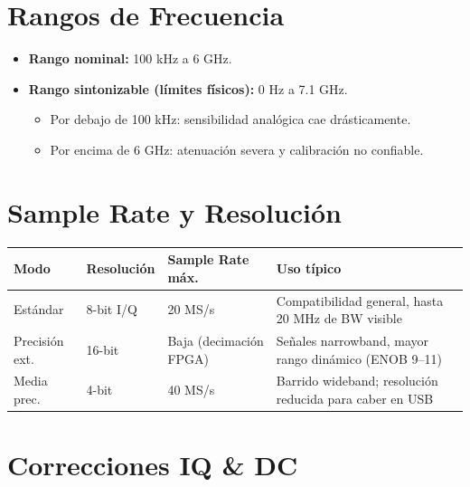 \documentclass[11pt]{article}
\begin{document}
\section{Rangos de Frecuencia}

\begin{itemize}
    \item \textbf{Rango nominal:} 100 kHz a 6 GHz.
    \item \textbf{Rango sintonizable (límites físicos):} 0 Hz a 7.1 GHz.
    \begin{itemize}
        \item Por debajo de 100 kHz: sensibilidad analógica cae drásticamente.
        \item Por encima de 6 GHz: atenuación severa y calibración no confiable.
    \end{itemize}
\end{itemize}

\section{Sample Rate y Resolución}

\begin{table}[h]
    \centering
    \begin{tabular}{llll}
        \toprule
        \textbf{Modo} & \textbf{Resolución} & \textbf{Sample Rate máx.} & \textbf{Uso típico} \\
        \midrule
        Estándar       & 8-bit I/Q  & 20 MS/s  & Compatibilidad general, hasta 20 MHz de BW visible \\
        Precisión ext. & 16-bit     & Baja (decimación FPGA) & Señales narrowband, mayor rango dinámico (ENOB 9--11) \\
        Media prec.    & 4-bit      & 40 MS/s  & Barrido wideband; resolución reducida para caber en USB \\
        \bottomrule
    \end{tabular}
\end{table}

\section{Correcciones IQ \& DC}
\end{document}
